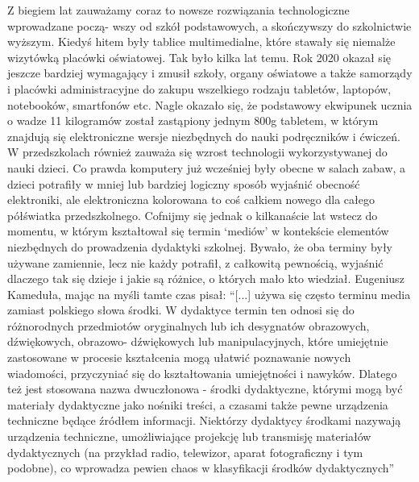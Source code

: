 \documentclass{article}
\begin{document}
	Z biegiem lat zauważamy coraz to nowsze rozwiązania technologiczne wprowadzane począ- wszy od szkół podstawowych, a skończywszy do szkolnictwie wyższym. Kiedyś hitem były tablice multimedialne, które stawały się niemalże wizytówką placówki oświatowej. Tak było kilka lat temu. Rok 2020 okazał się jeszcze bardziej wymagający i zmusił szkoły, organy oświatowe a także samorządy i placówki administracyjne do zakupu wszelkiego rodzaju tabletów, laptopów, notebooków, smartfonów etc. Nagle okazało się, że podstawowy ekwipunek ucznia o wadze 11 kilogramów został zastąpiony jednym 800g tabletem, w którym znajdują się elektroniczne wersje niezbędnych do nauki podręczników i ćwiczeń. W przedszkolach również zauważa się wzrost technologii wykorzystywanej do nauki dzieci. Co prawda komputery już wcześniej były obecne w salach zabaw, a dzieci potrafiły w mniej lub bardziej logiczny sposób wyjaśnić obecność elektroniki, ale elektroniczna kolorowana to coś całkiem nowego dla całego półświatka przedszkolnego. Cofnijmy się jednak o kilkanaście lat wstecz do momentu, w którym kształtował się termin ‘mediów’ w kontekście elementów niezbędnych do prowadzenia dydaktyki szkolnej. Bywało, że oba terminy były używane zamiennie, lecz nie każdy potrafił, z całkowitą pewnością, wyjaśnić dlaczego tak się dzieje i jakie są różnice, o których mało kto wiedział. Eugeniusz Kameduła\cite{ref7}, mając na myśli tamte czas pisał: “[...] używa się często terminu media zamiast polskiego słowa środki. W dydaktyce termin ten odnosi się do różnorodnych przedmiotów oryginalnych lub ich desygnatów obrazowych, dźwiękowych, obrazowo- dźwiękowych lub manipulacyjnych, które umiejętnie zastosowane w procesie kształcenia mogą ułatwić poznawanie nowych wiadomości, przyczyniać się do kształtowania umiejętności i nawyków. Dlatego też jest stosowana nazwa dwuczłonowa - środki dydaktyczne, którymi mogą być materiały dydaktyczne jako nośniki treści, a czasami także pewne urządzenia techniczne będące źródłem informacji. Niektórzy dydaktycy środkami nazywają urządzenia techniczne, umożliwiające projekcję lub transmisję materiałów dydaktycznych (na przykład radio, telewizor, aparat fotograficzny i tym podobne), co wprowadza pewien chaos w klasyfikacji środków dydaktycznych”
\end{document}
